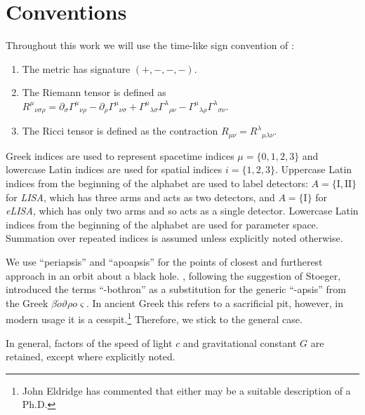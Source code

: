 \chapter{Conventions}

Throughout this work we will use the time-like sign convention of \citet{Landau1975}:
\begin{enumerate}
\item The metric has signature $(+,-,-,-)$.
\item The Riemann tensor is defined as ${R^\mu}_{\nu\sigma\rho} = \partial_\sigma {\Gamma^\mu}_{\nu\rho} - \partial_\rho {\Gamma^\mu}_{\nu\sigma} + {\Gamma^\mu}_{\lambda\sigma}{\Gamma^\lambda}_{\rho\nu} - {\Gamma^\mu}_{\lambda\rho}{\Gamma^\lambda}_{\sigma\nu}$.
\item The Ricci tensor is defined as the contraction $R_{\mu\nu} = {R^\lambda}_{\mu\lambda\nu}$.
\end{enumerate}
Greek indices are used to represent spacetime indices $\mu = \{0,1,2,3\}$ %
and lowercase Latin indices are used for spatial indices $i = \{1,2,3\}$. Uppercase Latin indices from the beginning of the alphabet are used to label detectors: $A = \{\mathrm{I}, \mathrm{II}\}$ for \textit{LISA}, which has three arms and acts as two detectors, and $A = \{\mathrm{I}\}$ for \textit{eLISA}, which has only two arms and so acts as a single detector. Lowercase Latin indices from the beginning of the alphabet are used for parameter space. Summation over repeated indices is assumed unless explicitly noted otherwise.

We use ``periapsis'' and ``apoapsis'' for the points of closest and furtherest approach in an orbit about a black hole. \citet{Frank1976}, following the suggestion of Stoeger, introduced the terms ``-bothron'' as a substitution for the generic ``-apsis'' from the Greek {$\mathit{\beta\acute{o}\vartheta\rho o \varsigma}$}. In ancient Greek this refers to a sacrificial pit, however, in modern usage it is a cesspit.\footnote{John Eldridge has commented that either may be a suitable description of a Ph.D.} Therefore, we stick to the general case.

In general, factors of the speed of light $c$ and gravitational constant $G$ are retained, except where explicitly noted. 

